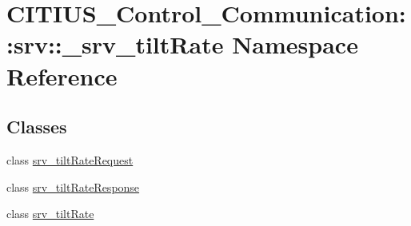 \hypertarget{namespace_c_i_t_i_u_s___control___communication_1_1srv_1_1__srv__tilt_rate}{\section{\-C\-I\-T\-I\-U\-S\-\_\-\-Control\-\_\-\-Communication\-:\-:srv\-:\-:\-\_\-srv\-\_\-tilt\-Rate \-Namespace \-Reference}
\label{namespace_c_i_t_i_u_s___control___communication_1_1srv_1_1__srv__tilt_rate}
}
\subsection*{\-Classes}
\begin{DoxyCompactItemize}
\item 
class \hyperlink{class_c_i_t_i_u_s___control___communication_1_1srv_1_1__srv__tilt_rate_1_1srv__tilt_rate_request}{srv\-\_\-tilt\-Rate\-Request}
\item 
class \hyperlink{class_c_i_t_i_u_s___control___communication_1_1srv_1_1__srv__tilt_rate_1_1srv__tilt_rate_response}{srv\-\_\-tilt\-Rate\-Response}
\item 
class \hyperlink{class_c_i_t_i_u_s___control___communication_1_1srv_1_1__srv__tilt_rate_1_1srv__tilt_rate}{srv\-\_\-tilt\-Rate}
\end{DoxyCompactItemize}
